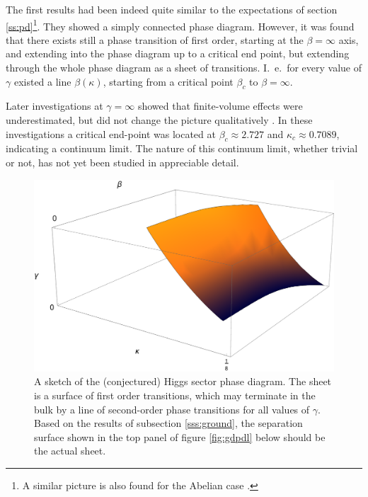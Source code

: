 \documentclass[final,12pt]{article}
\newcommand*{\1}{1\!\!\!\bot}
\begin{document}
The first results had been indeed quite similar \cite{Kuhnelt:1983mw,Gerdt:1984ft,Evertz:1985fc,Langguth:1985eu,Langguth:1985dr,Gerdt:1985rb,Evertz:1986vp} to the expectations of section \ref{ss:pd}\footnote{A similar picture is also found for the Abelian case \cite{Jansen:1985nh}.}. They showed a simply connected phase diagram. However, it was found that there exists still a phase transition of first order, starting at the $\beta=\infty$ axis, and extending into the phase diagram up to a critical end point, but extending through the whole phase diagram as a sheet of transitions. I.\ e.\ for every value of $\gamma$ existed a line $\beta(\kappa)$, starting from a critical point $\beta_c$ to $\beta=\infty$.

Later investigations at $\gamma=\infty$ showed that finite-volume effects were underestimated, but did not change the picture qualitatively \cite{Bonati:2009pf,Bonati:2009yi}. In these investigations a critical end-point was located at $\beta_c\approx2.727$ and $\kappa_c\approx0.7089$, indicating a continuum limit. The nature of this continuum limit, whether trivial or not, has not yet been studied in appreciable detail.

\begin{figure}[!htbp]
\begin{minipage}{0.7\linewidth}
 \includegraphics[width=\linewidth]{pd-final}
\end{minipage}
\begin{minipage}{0.3\linewidth}
 \caption{\label{fig:pd}A sketch of the (conjectured) Higgs sector phase diagram. The sheet is a surface of first order transitions, which may terminate in the bulk by a line of second-order phase transitions for all values of $\gamma$. Based on the results of subsection \ref{sss:ground}, the separation surface shown in the top panel of figure \ref{fig:gdpdl} below should be the actual sheet.}
\end{minipage}
\end{figure}
\end{document}

